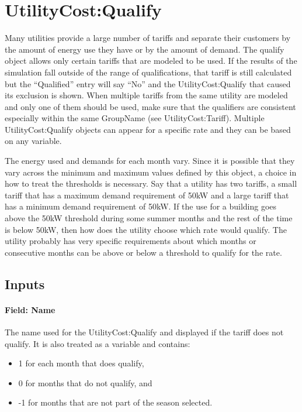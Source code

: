 \section{UtilityCost:Qualify}\label{utilitycostqualify}

Many utilities provide a large number of tariffs and separate their customers by the amount of energy use they have or by the amount of demand. The qualify object allows only certain tariffs that are modeled to be used. If the results of the simulation fall outside of the range of qualifications, that tariff is still calculated but the ``Qualified'' entry will say ``No'' and the UtilityCost:Qualify that caused its exclusion is shown. When multiple tariffs from the same utility are modeled and only one of them should be used, make sure that the qualifiers are consistent especially within the same GroupName (see UtilityCost:Tariff). Multiple UtilityCost:Qualify objects can appear for a specific rate and they can be based on any variable.

The energy used and demands for each month vary. Since it is possible that they vary across the minimum and maximum values defined by this object, a choice in how to treat the thresholds is necessary. Say that a utility has two tariffs, a small tariff that has a maximum demand requirement of 50kW and a large tariff that has a minimum demand requirement of 50kW. If the use for a building goes above the 50kW threshold during some summer months and the rest of the time is below 50kW, then how does the utility choose which rate would qualify. The utility probably has very specific requirements about which months or consecutive months can be above or below a threshold to qualify for the rate.

\subsection{Inputs}\label{inputs-070}

\paragraph{Field: Name}\label{field-name-063}

The name used for the UtilityCost:Qualify and displayed if the tariff does not qualify. It is also treated as a variable and contains:

\begin{itemize}
\item
  1 for each month that does qualify,
\item
  0 for months that do not qualify, and
\item
  -1 for months that are not part of the season selected.
\end{itemize}

